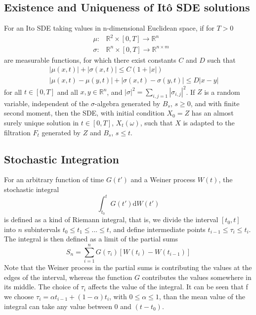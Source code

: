 \documentclass[12pt]{report}
\begin{document}
\subsection{Existence and Uniqueness of It\^{o} SDE solutions}
For an Ito SDE taking values in n-dimensional Euclidean space, if for $T>0$\\
\begin{eqnarray*}
&\mu:&\mathbb{R}^2\times[0,T]\rightarrow \mathbb{R}^n\\
&\sigma:&\mathbb{R}^n \times[0,T] \rightarrow \mathbb{R}^{n\times m}
\end{eqnarray*}
are measurable functions, for which there exist constants $C$ and $D$ such that 
\begin{eqnarray*}
&&|\mu(x,t)|+|\sigma(x,t)|\leq C(1+|x|)\\
&&|\mu(x,t)-\mu(y,t)|+|\sigma(x,t)-\sigma(y,t)|\leq D|x-y|
\end{eqnarray*}
for all $t\in [0,T]$ and all $x,y\in \mathbb{R}^n$, and $|\sigma|^2=\sum_{i,j=1}|\sigma_{i,j}|^2$. 
If $Z$ is a random variable, independent of the $\sigma$-algebra generated by $B_s$, $s\geq 0$, and with finite second moment, then the SDE, with initial condition $X_0=Z$ has an almost surely unique solution in $t\in[0,T]$, $X_t(\omega)$, such that $X$ is adapted to the filtration $F_t$ generated by $Z$ and $B_s$, $s\leq t$.


\subsection{Stochastic Integration}
For an arbitrary function of time $G(t')$ and a Weiner process $W(t)$, the stochastic integral 
\begin{equation*}
\int_{t_0}^t G(t')\mathrm{d}W(t')
\end{equation*}
is defined as a kind of Riemann integral, that is, we divide the interval $[t_0,t]$ into $n$ subintervals $t_0\leq t_1\leq ...\leq t$, and define intermediate points $t_{i-1}\leq\tau_i\leq t_{i}$. The integral is then defined as a limit of the partial sums 
\begin{equation*}
S_n=\sum_{i=1}^nG(\tau_i)[W(t_i)-W(t_{i-1})]
\end{equation*}
Note that the Weiner process in the partial sums is contributing the values at the edges of the interval, whereas the function $G$ contributes the values somewhere in its middle.
The choice of $\tau_i$ affects the value of the integral. It can be seen that f we choose $\tau_i=\alpha t_{i-1}+(1-\alpha)t_i$, with $0\leq \alpha\leq 1$,  than the mean value of the integral can take any value between 0 and $(t-t_0)$. 
\end{document}
